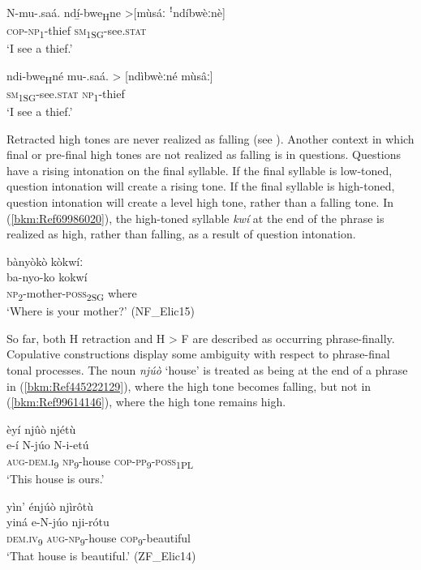 \ea
\gll N-mu-.saá.    ndí̲-bwe\textsubscript{H}ne    >[mùsáː ꜝndíbwèːnè]\\
\textsc{cop}-\textsc{np}\textsubscript{1}-thief  \textsc{sm}\textsubscript{1SG}-see.\textsc{stat}\\
\glt ‘I see a thief.’
\z

\ea
\gll ndi-bwe\textsubscript{H}né    mu-.saá.    > [ndìbwèːné mùsâː]\\
\textsc{sm}\textsubscript{1SG}-see.\textsc{stat}  \textsc{np}\textsubscript{1}-thief\\
\glt ‘I see a thief.’
\z

Retracted high tones are never realized as falling (see ). Another context in which final or pre-final high tones are not realized as falling is in questions. Questions have a rising intonation on the final syllable. If the final syllable is low-toned, question intonation will create a rising tone. If the final syllable is high-toned, question intonation will create a level high tone, rather than a falling tone. In (\ref{bkm:Ref69986020}), the high-toned sylla\-ble \textit{kwí} at the end of the phrase is realized as high, rather than falling, as a result of question intona\-tion.

\ea
\label{bkm:Ref69986020}
bànyòkò kòkwíː\\
\gll ba-nyo-ko      kokwí\\
\textsc{np}\textsubscript{2}-mother-\textsc{poss}\textsubscript{2SG}    where\\
\glt ‘Where is your mother?’ (NF\_Elic15)
\z

So far, both H retraction and H > F are described as occurring phrase-finally. Copulative constructions display some ambiguity with respect to phrase-final tonal processes. The noun \textit{njúò} ‘house’ is treated as being at the end of a phrase in (\ref{bkm:Ref445222129}), where the high tone becomes falling, but not in (\ref{bkm:Ref99614146}), where the high tone re\-mains high.

\ea
\label{bkm:Ref445222129}
èyí njûò njétù\\
\gll e-í    N-júo    N-i-etú\\
\textsc{aug}-\textsc{dem}.\textsc{i}\textsubscript{9}  \textsc{np}\textsubscript{9}-house  \textsc{cop}-\textsc{pp}\textsubscript{9}-\textsc{poss}\textsubscript{1PL}\\
\glt ‘This house is ours.’
\z

\ea
\label{bkm:Ref99614146}
yìn’ énjúò njìrôtù\\
\gll yiná    e-N-júo    nji-rótu\\
\textsc{dem}\-.\textsc{iv}\textsubscript{9}  \textsc{aug}-\textsc{np}\textsubscript{9}-house  \textsc{cop}\textsubscript{9}-beautiful\\
\glt ‘That house is beautiful.’ (ZF\_Elic14)
\z

